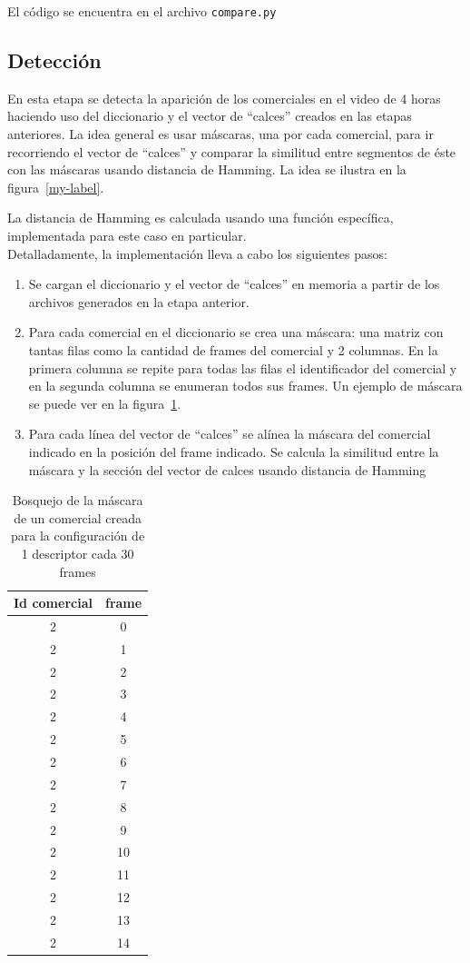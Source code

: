\documentclass[14pt,letterpaper,hidelinks]{extarticle}
\begin{document}
El código se encuentra en el archivo \verb+compare.py+

\subsection{Detección}
En esta etapa se detecta la aparición de los comerciales en el video de 4 horas haciendo uso del diccionario y el vector de ``calces'' creados en las etapas anteriores. La idea general es usar máscaras, una por cada comercial, para ir recorriendo el vector de ``calces'' y comparar la similitud entre segmentos de éste con las máscaras usando distancia de Hamming. La idea se ilustra en la figura~\ref{my-label}.

La distancia de Hamming es calculada usando una función específica, implementada para este caso en particular.\\

Detalladamente, la implementación lleva a cabo los siguientes pasos:
\begin{enumerate}
\item Se cargan el diccionario y el vector de ``calces'' en memoria a partir de los archivos generados en la etapa anterior.
\item Para cada comercial en el diccionario se crea una máscara: una matriz con tantas filas como la cantidad de frames del comercial y 2 columnas. En la primera columna se repite para todas las filas el identificador del comercial y en la segunda columna se enumeran todos sus frames. Un ejemplo de máscara se puede ver en la figura~\ref{tab:mask}.
\item Para cada línea del vector de ``calces'' se alínea la máscara del comercial indicado en la posición del frame indicado. Se calcula la similitud entre la máscara y la sección del vector de calces usando distancia de Hamming
\end{enumerate}

\begin{table}[]
\centering
\begin{tabular}{@{}cc@{}}
\toprule
Id comercial & frame \\ \midrule
2 & 0 \\
2 & 1 \\
2 & 2 \\
2 & 3 \\
2 & 4 \\
2 & 5 \\
2 & 6 \\
2 & 7 \\
2 & 8 \\
2 & 9 \\
2 & 10 \\
2 & 11 \\
2 & 12 \\
2 & 13 \\
2 & 14 \\ \bottomrule
\end{tabular}
\captionsetup{justification=centering,margin=2cm}
\caption{Bosquejo de la máscara de un comercial creada para la configuración de 1 descriptor cada 30 frames\label{tab:mask}}
\end{table}
\end{document}
